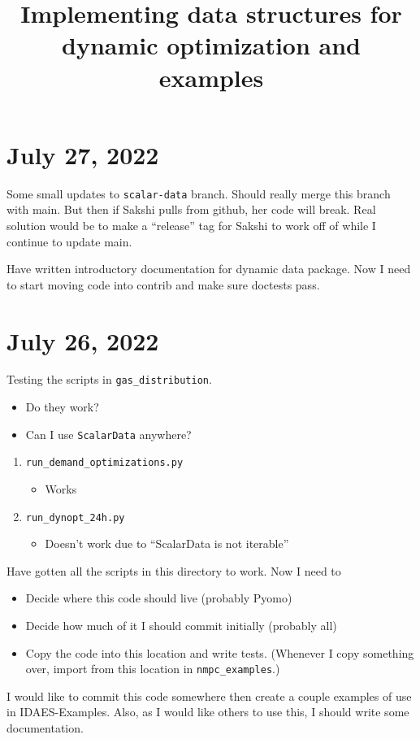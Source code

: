\documentclass{article}
\title{Implementing data structures for dynamic optimization and examples}
\begin{document}
\maketitle

\section{July 27, 2022}

Some small updates to \texttt{scalar-data} branch.
Should really merge this branch with main. But then
if Sakshi pulls from github, her code will break.
Real solution would be to make a ``release'' tag for Sakshi
to work off of while I continue to update main.

\medskip

Have written introductory documentation for dynamic data
package. Now I need to start moving code into contrib and make
sure doctests pass.

\section{July 26, 2022}
Testing the scripts in \texttt{gas\_distribution}.
\begin{itemize}
  \item Do they work?
  \item Can I use \texttt{ScalarData} anywhere? 
\end{itemize}
\begin{enumerate}
  \item \texttt{run\_demand\_optimizations.py}
    \begin{itemize}
      \item Works
    \end{itemize}
  \item \texttt{run\_dynopt\_24h.py}
    \begin{itemize}
      \item Doesn't work due to ``ScalarData is not iterable''
    \end{itemize}
\end{enumerate}

Have gotten all the scripts in this directory to work.
Now I need to
\begin{itemize}
  \item Decide where this code should live (probably Pyomo)
  \item Decide how much of it I should commit initially (probably all)
  \item Copy the code into this location and write tests.
    (Whenever I copy something over, import from this location in
    \texttt{nmpc\_examples}.)
\end{itemize}
I would like to commit this code somewhere then create a couple examples of use
in IDAES-Examples. Also, as I would like others to use this, I should write
some documentation.
\end{document}
